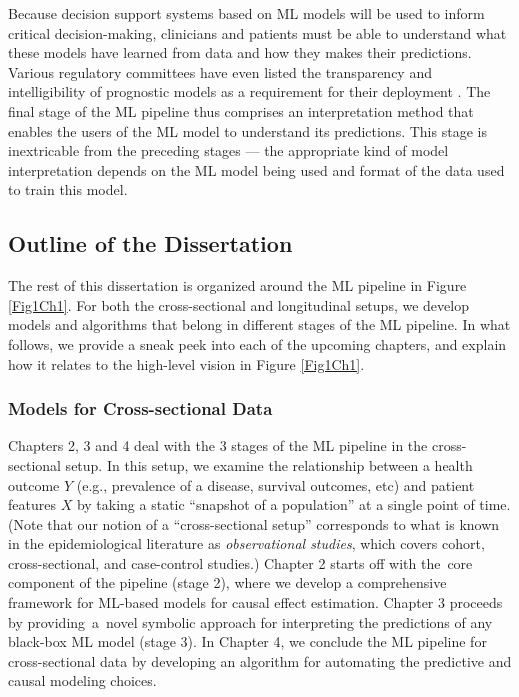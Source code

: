 \documentclass [PhD] {uclathes}
\begin{document}
Because decision support systems based on ML models will be used to inform critical decision-making, clinicians and patients must be able to understand what these models have learned from data and how they makes their predictions. Various regulatory committees have even listed the transparency and intelligibility of prognostic models as a requirement for their deployment \cite{kattan2016american}. The final stage of the ML pipeline thus comprises an interpretation method that enables the users of the ML model to understand its predictions. This stage is inextricable from the preceding stages --- the appropriate kind of model interpretation depends on the ML model being used and format of the data used to train this model. 

\subsection{Outline of the Dissertation}
The rest of this dissertation is organized around the ML pipeline in Figure \ref{Fig1Ch1}. For both the cross-sectional and longitudinal setups, we develop models and algorithms that belong in different stages of the ML pipeline. In what follows, we provide a sneak peek into each of the upcoming chapters, and explain how it relates to the high-level vision in Figure \ref{Fig1Ch1}.  

\label{Sec112}
\subsubsection{Models for Cross-sectional Data} %
Chapters 2, 3 and 4 deal with the 3 stages of the ML pipeline in the cross-sectional setup. In this setup, we examine the relationship between a health outcome $Y$ (e.g., prevalence of a disease, survival outcomes, etc) and patient features $X$ by taking a static ``snapshot of a population'' at a single point of time. (Note that our notion of a ``cross-sectional setup'' corresponds to what is known in the epidemiological literature as \textit{observational studies}, which covers cohort, cross-sectional, and case-control studies.) Chapter 2 starts off with the~core component of the pipeline (stage 2), where we develop a comprehensive framework for ML-based models for causal effect estimation. Chapter 3 proceeds by providing~a~novel symbolic approach for interpreting the predictions of any black-box ML model (stage 3). In Chapter 4, we conclude the ML pipeline for cross-sectional data by developing an algorithm for automating the predictive and causal modeling choices.
\end{document}
